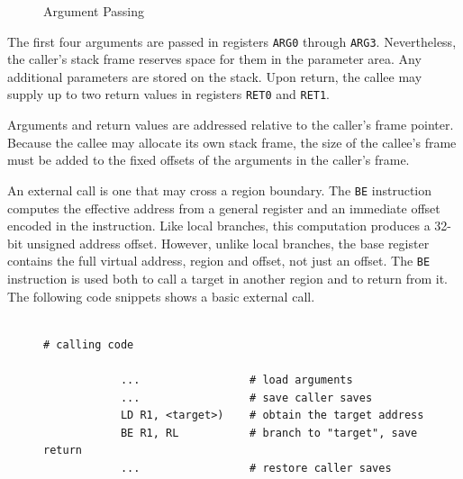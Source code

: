 \begin{figure}[H]
\begin{center}
\end{center}
\caption{Argument Passing}
\label{fig:argument_passing}
\end{figure}

The first four arguments are passed in registers \texttt{ARG0} through \texttt{ARG3}. Nevertheless, the caller's stack frame reserves space for them in the parameter area. Any additional parameters are stored on the stack. Upon return, the callee may supply up to two return values in registers \texttt{RET0} and \texttt{RET1}.

Arguments and return values are addressed relative to the caller's frame pointer. Because the callee may allocate its own stack frame, the size of the callee's frame must be added to the fixed offsets of the arguments in the caller's frame.


An external call is one that may cross a region boundary. The \texttt{BE} instruction computes the effective address from a general register and an immediate offset encoded in the instruction. Like local branches, this computation produces a 32-bit unsigned address offset. However, unlike local branches, the base register contains the full virtual address, region and offset, not just an offset. The \texttt{BE} instruction is used both to call a target in another region and to return from it. The following code snippets shows a basic external call.

\begin{figure}[H]
\centering
\lstset{style=codesnippetstyle}
\begin{lstlisting}

# calling code

			...					# load arguments
			...					# save caller saves
			LD R1, <target>)    # obtain the target address    
			BE R1, RL    		# branch to "target", save return
			...					# restore caller saves
\end{lstlisting}
\end{figure}


